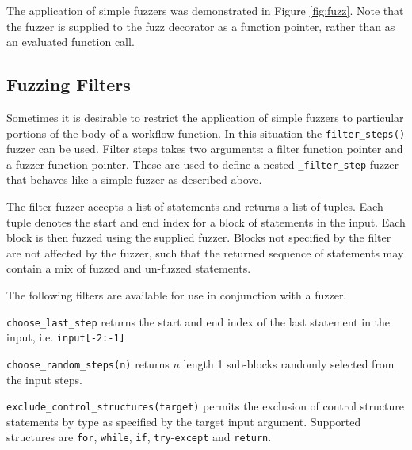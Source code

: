 \documentclass{sig-alternate}
\newenvironment{FunctionList}{%
\lstset{basicstyle=\ttfamily\bfseries\small}
\begin{list}{}{\leftmargin=5pt}
}{\end{list}\lstset{basicstyle=\ttfamily\small}}
\begin{document}
The application of simple fuzzers was demonstrated in Figure \ref{fig:fuzz}.
Note that the fuzzer is supplied to the fuzz decorator as a function pointer,
rather than as an evaluated function call.


\subsection{Fuzzing Filters}


Sometimes it is desirable to restrict the application of simple fuzzers to
particular portions of the body of a workflow function.  In this situation the
\lstinline!filter_steps()! fuzzer can be used.  Filter steps takes two
arguments: a filter function pointer and a fuzzer function pointer.  These are
used to define a nested \lstinline!_filter_step! fuzzer that behaves like a
simple fuzzer as described above.

The filter fuzzer accepts a list of statements and returns a list of tuples.
Each tuple denotes the start and end index for a block of statements in the
input.  Each block is then fuzzed using the supplied fuzzer.  Blocks not
specified by the filter are not affected by the fuzzer, such that the returned
sequence of statements may contain a mix of fuzzed and un-fuzzed statements.

The following filters are available for use in conjunction with a fuzzer.

\begin{FunctionList}

\item \lstinline!choose_last_step! returns the start and end index of the last
  statement in the input, i.e. \lstinline!input[-2:-1]!

\item \lstinline!choose_random_steps(n)!  returns $n$ length 1 sub-blocks
  randomly selected from the input steps.

\item \lstinline!exclude_control_structures(target)! permits the exclusion of
  control structure statements by type as specified by the target input
  argument. Supported structures are \lstinline!for!, \lstinline!while!,
  \lstinline!if!, \lstinline!try!-\lstinline!except! and \lstinline!return!.

\end{FunctionList}
\end{document}
